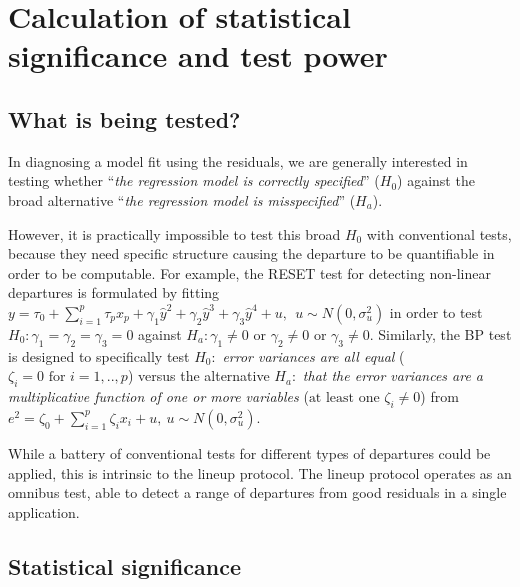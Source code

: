 \documentclass[]{interact}
\theoremstyle{plain}%
\theoremstyle{definition}
\theoremstyle{remark}
\begin{document}
\hypertarget{calculation-of-statistical-significance-and-test-power}{%
\section{Calculation of statistical significance and test
power}\label{calculation-of-statistical-significance-and-test-power}}

\hypertarget{what-is-being-tested}{%
\subsection{What is being tested?}\label{what-is-being-tested}}

In diagnosing a model fit using the residuals, we are generally
interested in testing whether ``\emph{the regression model is correctly
specified}'' (\(H_0\)) against the broad alternative ``\emph{the
regression model is misspecified}'' (\(H_a\)).

However, it is practically impossible to test this broad \(H_0\) with
conventional tests, because they need specific structure causing the
departure to be quantifiable in order to be computable. For example, the
RESET test for detecting non-linear departures is formulated by fitting
\(y = \tau_0 + \sum_{i=1}^{p}\tau_px_p +\gamma_1\hat{y}^2 + \gamma_2\hat{y}^3 + \gamma_3\hat{y}^4 + u, ~~u \sim N(0, \sigma_u^2)\)
in order to test \(H_0:\gamma_1 = \gamma_2 = \gamma_3 = 0\) against
\(H_a: \gamma_1 \neq 0 \text{ or } \gamma_2 \neq 0 \text{ or } \gamma_3 \neq 0\).
Similarly, the BP test is designed to specifically test \(H_0:\)
\emph{error variances are all equal}
(\(\zeta_i=0 \text{ for } i=1,..,p\)) versus the alternative \(H_a:\)
\emph{that the error variances are a multiplicative function of one or
more variables} (\(\text{at least one } \zeta_i\neq 0\)) from
\(e^2 = \zeta_0 + \sum_{i=1}^{p}\zeta_i x_i + u, ~ u\sim N(0,\sigma_u^2)\).

While a battery of conventional tests for different types of departures
could be applied, this is intrinsic to the lineup protocol. The lineup
protocol operates as an omnibus test, able to detect a range of
departures from good residuals in a single application.

\hypertarget{statistical-significance}{%
\subsection{\texorpdfstring{Statistical
significance\label{sig}}{Statistical significance}}\label{statistical-significance}}
\end{document}
